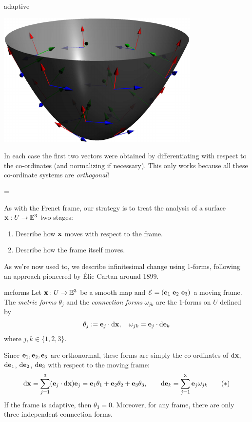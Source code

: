 \begin{examples}{}{adaptive}
\begin{center}
	\quad
	\href{http://www.math.uci.edu/~ndonalds/math162a/moving-paraboloid.html}{\includegraphics[scale=0.85]{moving-paraboloid}}
	\end{center}
In each case the first two vectors were obtained by differentiating with respect to the co-ordinates (and normalizing if necessary). This only works because all these co-ordinate systems are \emph{orthogonal}!
\end{examples}




\skip{}\bigskipamount
{}
\skip\footins=\bigskipamount
\vfil
\goodbreak

As with the Frenet frame, our strategy is to treat the analysis of a surface ${\mathbf{x}}:U\to\mathbb{E}^3$ two stages:
\begin{enumerate}
  \item Describe how ${\mathbf{x}}$ moves with respect to the frame.
  \item Describe how the frame itself moves. 
\end{enumerate}
As we're now used to, we describe infinitesimal change using 1-forms, following an approach pioneered by Élie Cartan around 1899.

\begin{defn}{}{mcforms}
Let ${\mathbf{x}}:U\to\mathbb{E}^3$ be a smooth map and $\mathcal{E}=({\mathbf{e}}_1\ {\mathbf{e}}_2\ {\mathbf{e}}_3)$ a moving frame. The \emph{metric forms} $\theta_j$ and the \emph{connection forms} $\omega_{jk}$ are the 1-forms on $U$ defined by
\[\theta_j:={\mathbf{e}}_j\cdot\mathrm{d}{\mathbf{x}},\quad \omega_{jk}={\mathbf{e}}_j\cdot\mathrm{d}{\mathbf{e}}_k\]
where $j,k\in\{1,2,3\}$.
\end{defn}

Since ${\mathbf{e}}_1,{\mathbf{e}}_2,{\mathbf{e}}_3$ are orthonormal, these forms are simply the co-ordinates of $\mathrm{d}{\mathbf{x}}$, $\mathrm{d}{\mathbf{e}}_1$, $\mathrm{d}{\mathbf{e}}_2$, $\mathrm{d}{\mathbf{e}}_3$ with respect to the moving frame:
\[\mathrm{d}{\mathbf{x}}=\sum_{j=1}^3({\mathbf{e}}_j\cdot\mathrm{d}{\mathbf{x}}){\mathbf{e}}_j={\mathbf{e}}_1\theta_1+{\mathbf{e}}_2\theta_2+{\mathbf{e}}_3\theta_3,\qquad \mathrm{d}{\mathbf{e}}_k=\sum_{j=1}^3{\mathbf{e}}_j\omega_{jk}\tag{$\ast$}\]
If the frame is adaptive, then $\theta_3=0$. Moreover, for any frame, there are only three independent connection forms.

